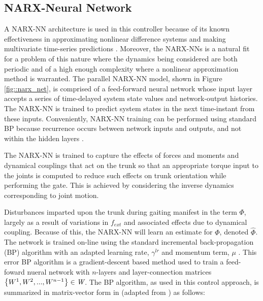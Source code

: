 		\subsection{NARX-Neural Network}

			A NARX-NN architecture is used in this controller because of  its known effectiveness in approximating nonlinear difference systems and making multivariate time-series predictions \cite{Tsungnan1996,ChenBillings1990,Hihi1996,Billings2013}. Moreover, the NARX-NNs is a natural fit for a problem of this nature where the dynamics being considered are both periodic and of a high enough complexity where a nonlinear approximation method is warranted. The parallel NARX-NN model, shown in Figure \ref{fig::narx_net}, is comprised of a feed-forward neural network whose input layer accepts a series of time-delayed system state values and network-output histories. The NARX-NN is trained to predict system states in the next time-instant from these inputs. Conveniently, NARX-NN training can be performed using standard BP because recurrence occurs between network inputs and outputs, and not within the hidden layers \cite{Nelles2001}.

			The NARX-NN is trained to capture the effects of forces and moments and dynamical couplings that act on the trunk so that an appropriate torque input to the joints is computed to reduce such effects on trunk orientation while performing the gate. This is achieved by considering the inverse dynamics corresponding to joint motion.

			Disturbances imparted upon the trunk during gaiting manifest in the term $\Phi$, largely as a result of variations in $f_{ext}$ and associated effects due to dynamical coupling. Because of this, the NARX-NN will learn an estimate for $\Phi$, denoted $\hat{\Phi}$. The network is trained on-line using the standard incremental back-propagation (BP) algorithm with an adapted learning rate, $\gamma^{lr}$ and momentum term, $\mu$ \cite{Rumelhart1988,Rumelhart1995}. This error BP algorithm is a gradient-descent based method used to train a feed-foward nueral network with $n$-layers and layer-connection matrices $\left\{W^{1},W^{2},...,W^{n-1}\right\} \in \emph{W}$. The BP algorithm, as used in this control approach, is summarized in matrix-vector form in (adapted from \cite{Rojas1996ch7}) as follows: 

